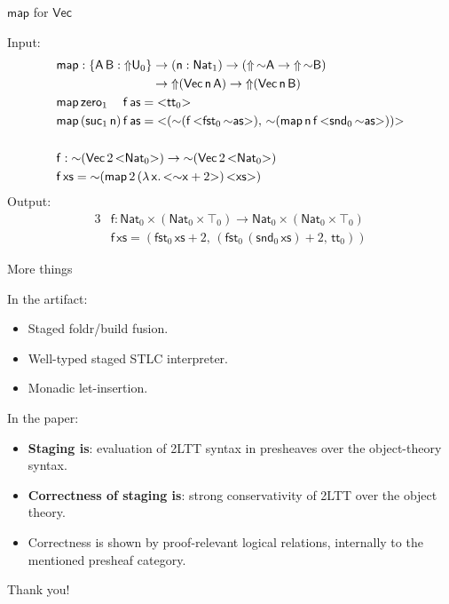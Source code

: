 \documentclass[dvipsnames,aspectratio=169]{beamer}
\newcommand{\msf}[1]{\mathsf{#1}}
\newcommand{\Lift}{{\Uparrow}}
\newcommand{\spl}{{\sim}}
\newcommand{\qut}[1]{{<}#1{>}}
\newcommand{\U}{\msf{U}}
\newcommand{\Nat}{\msf{Nat}}
\newcommand{\zero}{\msf{zero}}
\newcommand{\suc}{\msf{suc}}
\renewcommand{\tt}{\msf{tt}}
\newcommand{\fst}{\msf{fst}}
\newcommand{\snd}{\msf{snd}}
\theoremstyle{remark}
\newcommand{\Vect}{\msf{Vec}}
\newcommand{\msA}{\msf{A}}
\newcommand{\msB}{\msf{B}}
\newcommand{\msx}{\msf{x}}
\newcommand{\msas}{\msf{as}}
\newcommand{\msxs}{\msf{xs}}
\newcommand{\msff}{\msf{f}}
\newcommand{\msn}{\msf{n}}
\begin{document}
\begin{frame}{$\msf{map}$ for $\Vect$}

Input:
\begin{alignat*}{3}
  &\msf{map} : \{\msA\,\msB : \Lift \U_0\} \to
  (\msn : \Nat_1) \to (\Lift\,\spl\msA \to \Lift\,\spl\msB) \\
  & \hspace{7.7em} \to \Lift(\Vect\,\msn\,\msA) \to \Lift(\Vect\,\msn\,\msB)\\
  &\msf{map}\,\zero_1\hspace{1.25em}\msff\,\msas = \qut{\tt_0} \\
  &\msf{map}\,(\suc_1\,\msn)\,\msff\,\msas =
    \qut{(\spl(\msff\,\qut{\fst_0\,\spl \msas}),\,\spl(\msf{map}\,\msn\,\msff\,\qut{\snd_0\,\spl \msas}))} \\
  & \\
  & \msf{f} : \spl(\Vect\,2\,\qut{\Nat_0}) \to \spl(\Vect\,2\,\qut{\Nat_0}) \\
  & \msf{f}\,\msxs = \spl(\msf{map}\,2\,(\lambda\,\msx.\,\qut{\spl\msx + 2})\,\qut{\msxs})
\end{alignat*}
\pause
Output:
\begin{alignat*}{3}
  & \msf{f} : \Nat_0 \times (\Nat_0 \times \top_0) \to \Nat_0 \times (\Nat_0 \times \top_0) \\
  & \msf{f}\,\msxs = (\fst_0\,\msxs + 2,\,(\fst_0\,(\snd_0\,\msxs) + 2,\,\tt_0))
\end{alignat*}

\end{frame}

\begin{frame}{More things}

In the artifact:
\begin{itemize}
  \item Staged foldr/build fusion.
  \item Well-typed staged STLC interpreter.
  \item Monadic let-insertion.
\end{itemize}
\vspace{1em}
\pause

In the paper:
\begin{itemize}
  \item \textbf{Staging is}: evaluation of 2LTT syntax in presheaves over the object-theory syntax.
  \item \textbf{Correctness of staging is}: strong conservativity of 2LTT over the object theory.
  \item Correctness is shown by proof-relevant logical relations, internally to the mentioned presheaf category.
\end{itemize}

\end{frame}

\begin{frame}{}

\begin{center}
  \Large {Thank you!}
\end{center}

\end{frame}
\end{document}
